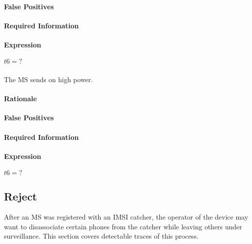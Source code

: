 \documentclass[a4paper,11pt,notitlepage,bigheadings,oneside]{scrartcl}
\begin{document}

\paragraph{False Positives}


\paragraph{Required Information}


\paragraph{Expression}

$t6 = ?$

\subsubsection{}

The MS sends on high power.

\paragraph{Rationale}


\paragraph{False Positives}


\paragraph{Required Information}


\paragraph{Expression}

$t6 = ?$

\subsection{Reject}

After an MS was registered with an IMSI catcher, the operator of the device may
want to disassociate certain phones from the catcher while leaving others under
surveillance. This section covers detectable traces of this process.
\end{document}
